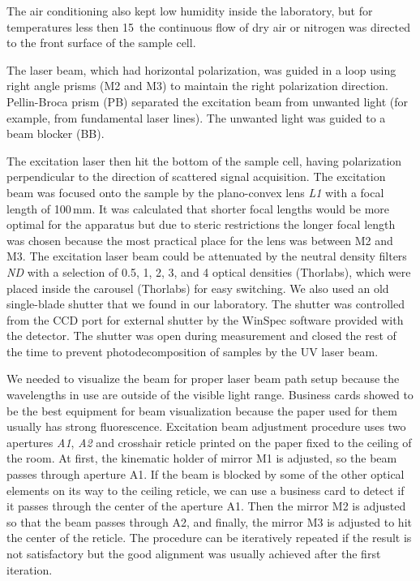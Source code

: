 The air conditioning also kept low humidity inside the laboratory, but for
temperatures less then 15\,\textcelsius{} the continuous flow of dry air or
nitrogen was directed to the front surface of the sample cell.

The laser beam, which had horizontal polarization, was guided in a loop using
right angle prisms (M2 and M3) to maintain the right polarization direction.
Pellin-Broca prism (PB) separated the excitation beam from unwanted light
(for example, from fundamental laser lines).
The unwanted light was guided to a beam blocker (BB).

The excitation laser then hit the bottom of the sample cell, having
polarization perpendicular to the direction of scattered signal acquisition.
The excitation beam was focused onto the sample by the plano-convex lens
\emph{L1} with a focal length of 100\,mm.
It was calculated that shorter focal lengths would be more optimal for the
apparatus but due to steric restrictions the longer focal length was
chosen because the most practical place for the lens was between M2 and M3.
The excitation laser beam could be attenuated by
the neutral density filters \emph{ND} with a selection of 0.5, 1, 2, 3, and 4
optical densities (Thorlabs), which were placed inside the carousel (Thorlabs)
for easy switching.
We also used an old single-blade shutter that we found in our laboratory.
The shutter was controlled from the CCD port for external shutter by the
WinSpec software provided with the detector.
The shutter was open during measurement and closed the rest of the time
to prevent photodecomposition of samples by the UV laser beam.

We needed to visualize the beam for proper laser beam path setup because the
wavelengths in use are outside of the visible light range.
Business cards showed to be the best equipment for beam visualization because
the paper used for them usually has strong fluorescence.
Excitation beam adjustment procedure uses two apertures \emph{A1}, \emph{A2}
and crosshair reticle printed on the paper fixed to the ceiling of the room.
At first, the kinematic holder of mirror M1 is adjusted, so the beam passes
through aperture A1.
If the beam is blocked by some of the other optical elements on its way to the
ceiling reticle, we can use a business card to detect if it passes through the
center of the aperture A1.
Then the mirror M2 is adjusted so that the beam passes through A2, and finally,
the mirror M3 is adjusted to hit the center of the reticle.
The procedure can be iteratively repeated if the result is not satisfactory but
the good alignment was usually achieved after the first iteration.

